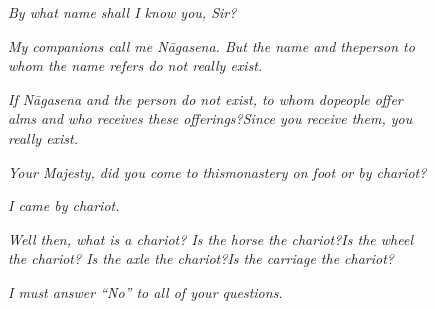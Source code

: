 \begin{figure}[H]
\begin{quoting}
\topsep=0pt
\begin{flushleft}
\vspace{-1mm}
\textit{By what name shall I know you, Sir?}
\vspace{-1mm}
\end{flushleft}
\begin{flushright}
\vspace{-1mm}
\textit{My companions call me Nāgasena. But the name and the\linebreak person to whom the name refers do not really exist.}
\vspace{-1mm}
\end{flushright}
\begin{flushleft}
\vspace{-1mm}
\textit{If Nāgasena and the person do not exist, to whom do\linebreak people offer alms and who receives these offerings?\linebreak Since you receive them, you really exist.}
\vspace{-1mm}
\end{flushleft}
\begin{flushright}
\vspace{-1mm}
\textit{Your Majesty, did you come to this\linebreak monastery on foot or by chariot?}
\vspace{-1mm}
\end{flushright}
\begin{flushleft}
\vspace{-1mm}
\textit{I came by chariot.}
\vspace{-1mm}
\end{flushleft}
\begin{flushright}
\vspace{-1mm}
\textit{Well then, what is a chariot? Is the horse the chariot?\linebreak Is the wheel the chariot? Is the axle the chariot?\linebreak Is the carriage the chariot?}
\vspace{-1mm}
\end{flushright}
\begin{flushleft}
\vspace{-1mm}
\textit{I must answer “No” to all of your questions.}
\vspace{-1mm}
\end{flushleft}

\end{quoting}
\end{figure}
